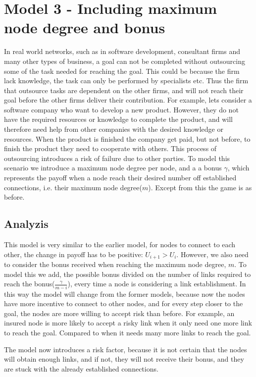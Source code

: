 


\section{Model 3 - Including maximum node degree and bonus}
In real world networks, such as in software development, consultant firms and many other types of business, a goal can not be completed without outsourcing some of the task needed for reaching the goal. This could be because the firm lack knowledge, the task can only be performed by specialists etc. Thus the firm that outsource tasks are dependent on the other firms, and will not reach their goal before the other firms deliver their contribution. 
For example, lets consider a software company who want to develop a new product. However, they do not have the required resources or knowledge to complete the product, and will therefore need help from other companies with the desired knowledge or resources. When the product is finished the company get paid, but not before, to finish the product they need to cooperate with others.
This process of outsourcing introduces a risk of failure due to other parties. To model this scenario we introduce a maximum node degree per node, and a a bonus $\gamma$, which represents the payoff when a node reach their desired number off established connections, i.e. their maximum node degree($m$).
Except from this the game is as before.
\subsection{Analyzis}
This model is very similar to the earlier model, for nodes to connect to each other, the change in payoff has to be positive: $U_{i+1} > U_{i}$. However, we also need to consider the bonus received when reaching the maximum node degree, $m$. 
To model this we add, the possible bonus divided on the number of links required to reach the bonus($\frac{\gamma}{m-i}$), every time a node is considering a link establishment. 
In this way the model will change from the former models, because now the nodes have more incentive to connect to other nodes, and for every step closer to the goal, the nodes are more willing to accept risk than before. For example, an insured node is more likely to accept a risky link when it only need one more link to reach the goal. Compared to when it needs many more links to reach the goal.

 The model now introduces a risk factor, because it is not certain that the nodes will obtain enough links, and if not, they will not receive their bonus, and they are stuck with the already established connections. 

